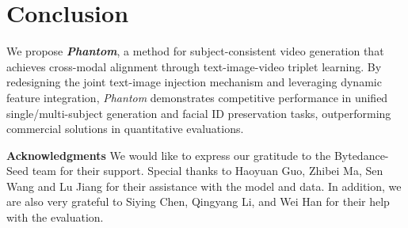 \section{Conclusion}
\label{sec:concluson}

We propose \textbf{\textit{Phantom}}, a method for subject-consistent video generation that achieves cross-modal alignment through text-image-video triplet learning. By redesigning the joint text-image injection mechanism and leveraging dynamic feature integration, \textit{Phantom} demonstrates competitive performance in unified single/multi-subject generation and facial ID preservation tasks, outperforming commercial solutions in quantitative evaluations. 


\noindent \textbf{Acknowledgments}
We would like to express our gratitude to the Bytedance-Seed team for their support. Special thanks to Haoyuan Guo, Zhibei Ma, Sen Wang and Lu Jiang for their assistance with the model and data. In addition, we are also very grateful to Siying Chen, Qingyang Li, and Wei Han for their help with the evaluation.
